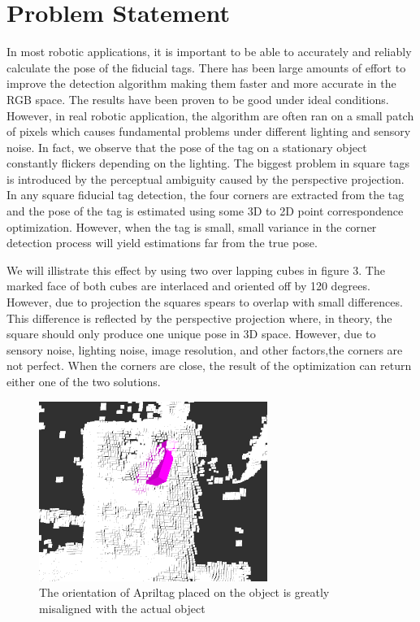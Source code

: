 \section{Problem Statement}
\label{sec:problem}
In most robotic applications, it is important to be able to accurately and reliably calculate the pose of the fiducial tags. There has been large amounts of effort to improve the detection algorithm making them faster and more accurate in the RGB space. The results have been proven to be good under ideal conditions. However, in real robotic application, the algorithm are often ran on a small patch of pixels which causes fundamental problems under different lighting and sensory noise. In fact, we observe that the pose of the tag on a stationary object constantly flickers depending on the lighting. The biggest problem in square tags is introduced by the perceptual ambiguity caused by the perspective projection. In any square fiducial tag detection, the four corners are extracted from the tag and the pose of the tag is estimated using some 3D to 2D point correspondence optimization. However, when the tag is small, small variance in the corner detection process will yield estimations far from the true pose. 

We will illistrate this effect by using two over lapping cubes in figure 3. The marked face of both cubes are interlaced and oriented off by 120 degrees. However, due to projection the squares spears to overlap with small differences. This difference is reflected by the perspective projection where, in theory, the square should only produce one unique pose in 3D space. However, due to sensory noise, lighting noise, image resolution, and other factors,the corners are not perfect. When the corners are close, the result of the optimization can return either one of the two solutions. 
\begin{figure}
\centering
\includegraphics[width=\columnwidth]{figs/mismatch_tag}
\caption{The orientation of Apriltag placed on the object is greatly misaligned with the actual object}
\label{fig:calib}
\end{figure}

